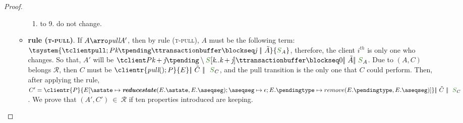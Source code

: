 \documentclass[envcountsect,runningheads,orivec]{llncs}
\begin{document}
\begin{proof}
\begin{itemize}
\begin{itemize}
\begin{enumerate}
						  \item to 9. do not change.
						\end{enumerate}
						\item {\bf rule (\textsc{t-pull})}. If $A \arroi{\pulltran} A'$, then by rule (\textsc{\footnotesize{t-pull}}), $A$ must be the following term: $ \tsystem{\tclienti{\tpullins}{\tknown}{\tpending}{\ttransactionbuffer}{\tsent}{\treceivebuffer}\ \bigpar\ \tilde{A}}{\queuemessage_A}$, therefore, the client $i^{th}$ is only one who changes. So that, $A'$ will be $\tclienti{\tprogram}{\tknown+\treceivebuffer}{\tpending \setminus \queuemessage[\tknown .. \tknown + \treceivebuffer]}{\ttransactionbuffer}{\tsent}{0} \bigpar \ \tilde{A} \bigpar\ \queuemessage_A$. Due to $(A,C)$ belongs $\mathcal{R}$, then $C$ must be $\clientr{\pullins}{\stateclient} \bigpar\ \tilde{C} \ \bigpar\ \ \queuemessage_C$, and the pull transition is the only one that $C$ could perform. Then, after applying the rule, $C' = \clientr{P}{\updatethree{E}{\known}{\reducestate{E.\known}{E.\receivebuffer}}{\receivebuffer}{\epsilon}{E.\pending}{\remove{E.\pending}{E.\receivebuffer}}} \bigpar\ \tilde{C} \ \bigpar\ \ \queuemessage_C$. We prove that $(A',C') \ \in \ \mathcal{R}$ if ten properties introduced are keeping.	
						

\end{itemize}
\end{itemize}
\end{proof}
\end{document}
